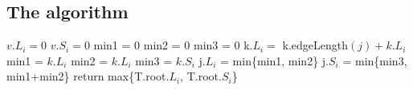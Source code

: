 \documentclass[12pt]{article}
\begin{document}
	\subsection*{The algorithm}
	\begin{algorithmic}
			\STATE $v.L_i = 0$
			\STATE $v.S_i = 0$
		\ENDFOR
				\STATE min1 = 0
				\STATE min2 = 0	
				\STATE min3 = 0
					\STATE k.$L_i =$ k.edgeLength$(j) + k.L_i$
						\STATE min1 = $k.L_i$
					\ENDIF
						\STATE min2 = $k.L_i$
					\ENDIF
						\STATE min3 = $k.S_i$
					\ENDIF
				\ENDFOR
				\STATE j.$L_i$ = min\{min1, min2\}
				\STATE j.$S_i$ = min\{min3, min1+min2\}
			\ENDFOR
		\ENDFOR
		\STATE return max\{T.root.$L_i$, T.root.$S_i$\}
	\end{algorithmic}
	
	
	
\end{document}
